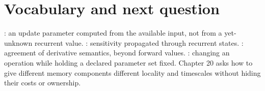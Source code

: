 \section{Vocabulary and next question}
: an update parameter computed from the
available input, not from a yet-unknown recurrent value.
: sensitivity propagated through recurrent states.
: agreement of derivative semantics, beyond forward values.
: changing an operation while holding a declared
parameter set fixed. Chapter 20 asks how to give different memory components
different locality and timescales without hiding their costs or ownership.
